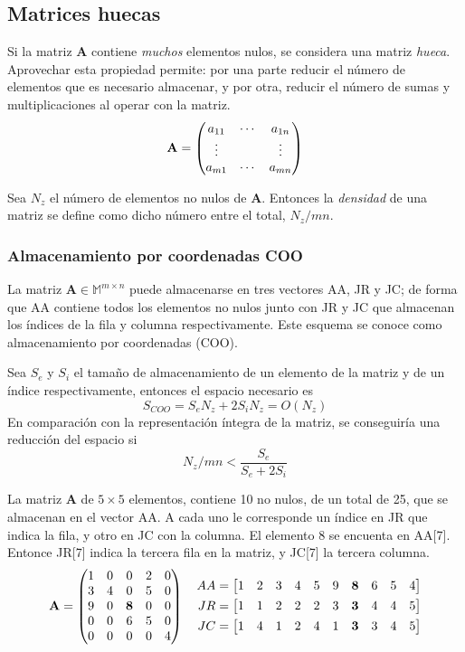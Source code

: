 \subsection{Matrices huecas}

Si la matriz \textbf{A} contiene \textit{muchos} elementos nulos, se considera 
una matriz \textit{hueca}. Aprovechar esta propiedad permite: por una parte 
reducir el número de elementos que es necesario almacenar, y por otra, reducir 
el número de sumas y multiplicaciones al operar con la matriz.
$$ \textbf{A} = \begin{pmatrix}  a_{11} & \cdots & a_{1n} \\
		\vdots &   & \vdots \\
		a_{m1} & \cdots & a_{mn}\\
	 \end{pmatrix}
$$

Sea $N_z$ el número de elementos no nulos de \textbf{A}. Entonces la 
\textit{densidad} de una matriz se define como dicho número entre el total, 
$N_z/mn$.

\subsubsection{Almacenamiento por coordenadas COO}

La matriz $\textbf{A} \in \mathbb{M}^{m\times n}$ puede almacenarse en tres 
vectores AA, JR y JC; de forma que AA contiene todos los elementos no nulos 
junto con JR y JC que almacenan los índices de la fila y columna 
respectivamente. Este esquema se conoce como almacenamiento por coordenadas 
(COO).

Sea $S_e$ y $S_i$ el tamaño de almacenamiento de un elemento de la matriz y de 
un índice respectivamente, entonces el espacio necesario es
$$ S_{COO} = S_eN_z + 2S_iN_z = O(N_z)$$
En comparación con la representación íntegra de la matriz, se conseguiría una 
reducción del espacio si
$$ N_z/mn < \frac{S_e}{S_e + 2S_i} $$

\begin{ejemplo}
La matriz \textbf{A} de $5\times5$ elementos, contiene 10 no nulos, de un total 
de 25, que se almacenan en el vector AA. A cada uno le corresponde un índice en 
JR que indica la fila, y otro en JC con la columna. El elemento 8 se encuenta en 
AA[7]. Entonce JR[7] indica la tercera fila en la matriz, y JC[7] la tercera 
columna.
$$ \textbf{A} = \begin{pmatrix} 
	1 & 0 & 0 & 2 & 0 \\
	3 & 4 & 0 & 5 & 0 \\
	9 & 0 & \textbf{8} & 0 & 0 \\
	0 & 0 & 6 & 5 & 0 \\
	0 & 0 & 0 & 0 & 4  \end{pmatrix}
\quad
\begin{aligned}
	AA = \begin{bmatrix}  1 & 2 & 3 & 4 & 5 & 9 & \textbf{8} & 6 & 5 & 4 \end{bmatrix} \\
	JR = \begin{bmatrix}  1 & 1 & 2 & 2 & 2 & 3 & \textbf{3} & 4 & 4 & 5 \end{bmatrix} \\
	JC = \begin{bmatrix}  1 & 4 & 1 & 2 & 4 & 1 & \textbf{3} & 3 & 4 & 5 \end{bmatrix}
\end{aligned}
$$
\end{ejemplo}

